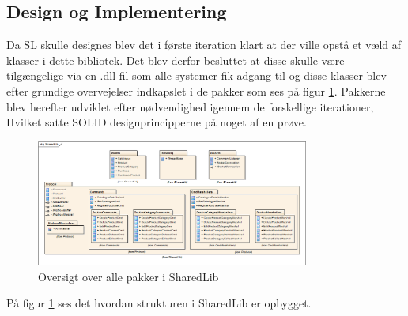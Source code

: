 \subsection{Design og Implementering}

Da \gls{SL} skulle designes blev det i første iteration klart at der ville opstå et væld af klasser i dette bibliotek. Det blev derfor besluttet at disse skulle være tilgængelige via en .dll fil som alle systemer fik adgang til og disse klasser blev efter grundige overvejelser indkapslet i de pakker som ses på figur \ref{fig:oversigtSL}. Pakkerne blev herefter udviklet efter nødvendighed igennem de forskellige iterationer, Hvilket satte SOLID designprincipperne på noget af en prøve.

\begin{figure}[!h]
    \centering
    \includegraphics[width=0.8\textwidth]{Systemdesign/SharedLib/Images/SharedLib_Package.png}
    \caption{Oversigt over alle pakker i SharedLib}
    \label{fig:oversigtSL}
\end{figure}

På figur \ref{fig:oversigtSL} ses det hvordan strukturen i SharedLib er opbygget.  





